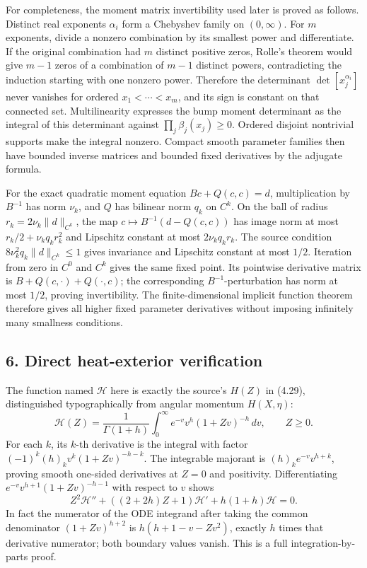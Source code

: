 \documentclass[10pt,a4paper]{article}
\begin{document}
For completeness, the moment matrix invertibility used later is proved as follows. Distinct real exponents \(\alpha_i\) form a Chebyshev family on \((0,\infty)\). For \(m\) exponents, divide a nonzero combination by its smallest power and differentiate. If the original combination had \(m\) distinct positive zeros, Rolle's theorem would give \(m-1\) zeros of a combination of \(m-1\) distinct powers, contradicting the induction starting with one nonzero power. Therefore the determinant \(\det[x_j^{\alpha_i}]\) never vanishes for ordered \(x_1<\cdots<x_m\), and its sign is constant on that connected set. Multilinearity expresses the bump moment determinant as the integral of this determinant against \(\prod_j\beta_j(x_j)\ge0\). Ordered disjoint nontrivial supports make the integral nonzero. Compact smooth parameter families then have bounded inverse matrices and bounded fixed derivatives by the adjugate formula.

For the exact quadratic moment equation \(Bc+Q(c,c)=d\), multiplication by \(B^{-1}\) has norm \(\nu_k\), and \(Q\) has bilinear norm \(q_k\) on \(C^k\). On the ball of radius \(r_k=2\nu_k\|d\|_{C^k}\), the map \(c\mapsto B^{-1}(d-Q(c,c))\) has image norm at most \(r_k/2+\nu_kq_kr_k^2\) and Lipschitz constant at most \(2\nu_kq_kr_k\). The source condition \(8\nu_k^2q_k\|d\|_{C^k}\le1\) gives invariance and Lipschitz constant at most \(1/2\). Iteration from zero in \(C^0\) and \(C^k\) gives the same fixed point. Its pointwise derivative matrix is \(B+Q(c,\cdot)+Q(\cdot,c)\); the corresponding \(B^{-1}\)-perturbation has norm at most \(1/2\), proving invertibility. The finite-dimensional implicit function theorem therefore gives all higher fixed parameter derivatives without imposing infinitely many smallness conditions.

\subsection{6. Direct heat-exterior verification}

The function named \(\mathcal H\) here is exactly the source's \(H(Z)\) in (4.29), distinguished typographically from angular momentum \(H(X,\eta)\):
\[
\mathcal H(Z)=\frac1{\Gamma(1+h)}\int_0^\infty e^{-v}v^h(1+Zv)^{-h}\,dv,
\qquad Z\ge0.
\]
For each \(k\), its \(k\)-th derivative is the integral with factor \((-1)^k(h)_kv^k(1+Zv)^{-h-k}\). The integrable majorant is \((h)_ke^{-v}v^{h+k}\), proving smooth one-sided derivatives at \(Z=0\) and positivity. Differentiating
\(e^{-v}v^{h+1}(1+Zv)^{-h-1}\) with respect to \(v\) shows
\[
Z^2\mathcal H''+((2+2h)Z+1)\mathcal H'+h(1+h)\mathcal H=0.
\]
In fact the numerator of the ODE integrand after taking the common denominator \((1+Zv)^{h+2}\) is \(h(h+1-v-Zv^2)\), exactly \(h\) times that derivative numerator; both boundary values vanish. This is a full integration-by-parts proof.
\end{document}
